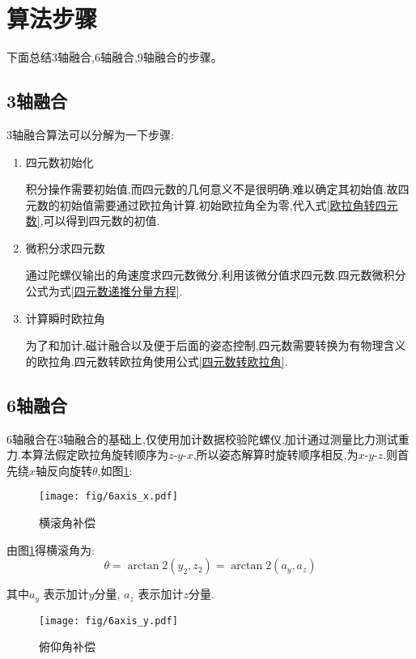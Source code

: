 
\section{算法步骤}\label{section:最终结论}
下面总结3轴融合,6轴融合,9轴融合的步骤。
\subsection{3轴融合}
3轴融合算法可以分解为一下步骤:
\begin{enumerate}
    \item 四元数初始化

        积分操作需要初始值,而四元数的几何意义不是很明确,难以确定其初始值.故四元数的初始值需要通过欧拉角计算.初始欧拉角全为零,代入式\ref{欧拉角转四元数},可以得到四元数的初值.
    \item 微积分求四元数

        通过陀螺仪输出的角速度求四元数微分,利用该微分值求四元数.四元数微积分公式为式\ref{四元数递推分量方程}.
    \item 计算瞬时欧拉角

        为了和加计,磁计融合以及便于后面的姿态控制,四元数需要转换为有物理含义的欧拉角.四元数转欧拉角使用公式\ref{四元数转欧拉角}.
\end{enumerate}

\subsection{6轴融合}
6轴融合在3轴融合的基础上,仅使用加计数据校验陀螺仪,加计通过测量比力测试重力.本算法假定欧拉角旋转顺序为$z$-$y$-$x$,所以姿态解算时旋转顺序相反,为$x$-$y$-$z$.则首先绕$x$轴反向旋转$\theta$,如图\ref{横滚角补偿}:
\begin{figure}[h]
\begin{center}
    \texttt{[image: fig/6axis\_x.pdf]}
    \caption{横滚角补偿}\label{横滚角补偿}
\end{center}
\end{figure}

由图\ref{横滚角补偿}得横滚角为:
\begin{equation}\label{加计横滚角}
    \theta = \arctan2(y_2,z_2) = \arctan2(a_y,a_z)
\end{equation} 

其中$a_y$   表示加计$y$分量,
$a_z$       表示加计$z$分量.
\begin{figure}[h]
    \begin{center}
        \texttt{[image: fig/6axis\_y.pdf]}
        \caption{俯仰角补偿}\label{俯仰角补偿}
    \end{center}
\end{figure}

